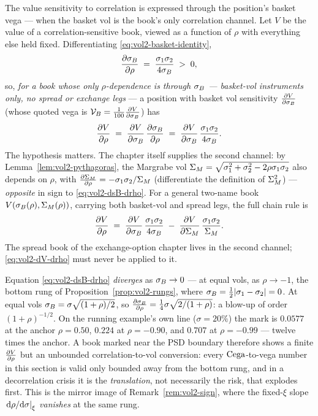 The value sensitivity to correlation is expressed through the position's
basket vega --- when the basket vol is the book's only correlation channel.
Let $V$ be the value of a correlation-sensitive book, viewed as a function
of $\rho$ with everything else held fixed. Differentiating
\eqref{eq:vol2-basket-identity},
\begin{equation}
\frac{\partial \sigma_B}{\partial \rho} \;=\; \frac{\sigma_1\sigma_2}{4\sigma_B} \;>\; 0,
\label{eq:vol2-dsB-drho}
\end{equation}
so, \emph{for a book whose only $\rho$-dependence is through $\sigma_B$ ---
basket-vol instruments only, no spread or exchange legs} --- a position with
basket vol sensitivity $\frac{\partial V}{\partial \sigma_B}$ (whose quoted vega is
$\mathcal{V}_B = \tfrac1{100}\frac{\partial V}{\partial \sigma_B}$) has
\begin{equation}
\frac{\partial V}{\partial \rho} \;=\; \frac{\partial V}{\partial \sigma_B}\,\frac{\partial \sigma_B}{\partial \rho}
             \;=\; \frac{\partial V}{\partial \sigma_B}\,\frac{\sigma_1\sigma_2}{4\sigma_B}.
\label{eq:vol2-dV-drho}
\end{equation}
The hypothesis matters. The chapter itself supplies the second channel: by
Lemma~\ref{lem:vol2-pythagoras}, the Margrabe vol
$\Sigma_M = \sqrt{\sigma_1^2 + \sigma_2^2 - 2\rho\sigma_1\sigma_2}$ also
depends on $\rho$, with
$\frac{\partial \Sigma_M}{\partial \rho} = -\sigma_1\sigma_2/\Sigma_M$ (differentiate the
definition of $\Sigma_M^2$) --- \emph{opposite} in sign to
\eqref{eq:vol2-dsB-drho}. For a general two-name book
$V(\sigma_B(\rho), \Sigma_M(\rho))$, carrying both basket-vol and spread legs,
the full chain rule is
\begin{equation}
\frac{\partial V}{\partial \rho}
 \;=\; \frac{\partial V}{\partial \sigma_B}\,\frac{\sigma_1\sigma_2}{4\sigma_B}
 \;-\; \frac{\partial V}{\partial \Sigma_M}\,\frac{\sigma_1\sigma_2}{\Sigma_M}.
\label{eq:vol2-dV-drho-full}
\end{equation}
The spread book of the exchange-option chapter lives in the second channel;
\eqref{eq:vol2-dV-drho} must never be applied to it.

\begin{remark}
\label{rem:vol2-dsB-blowup}
Equation \eqref{eq:vol2-dsB-drho} \emph{diverges} as $\sigma_B \to 0$ --- at
equal vols, as $\rho \to -1$, the bottom rung of
Proposition~\ref{prop:vol2-rungs}, where
$\sigma_B = \tfrac12\lvert\sigma_1 - \sigma_2\rvert = 0$. At equal vols
$\sigma_B = \sigma\sqrt{(1+\rho)/2}$, so
$\frac{\partial \sigma_B}{\partial \rho} = \tfrac14\sigma\sqrt{2/(1+\rho)}$: a blow-up of order
$(1+\rho)^{-1/2}$. On the running example's own line ($\sigma = 20\%$) the
mark is $0.0577$ at the anchor $\rho = 0.50$, $0.224$ at $\rho = -0.90$,
and $0.707$ at $\rho = -0.99$ --- twelve times the anchor. A book marked
near the PSD boundary therefore shows a finite $\frac{\partial V}{\partial \rho}$ but an
unbounded correlation-to-vol conversion: every $\mathrm{Cega}$-to-vega number in
this section is valid only bounded away from the bottom rung, and in a
decorrelation crisis it is the \emph{translation}, not necessarily the
risk, that explodes first. This is the mirror image of
Remark~\ref{rem:vol2-sign}, where the fixed-$\xi$ slope
$\left.\mathrm{d}\rho/\mathrm{d}\sigma\right|_{\xi}$ \emph{vanishes} at the same rung.
\end{remark}

